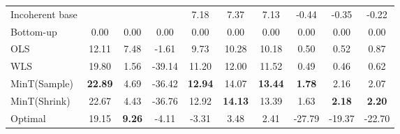 \documentclass[12pt]{article}
\theoremstyle{definition}
\begin{document}
\begin{table}[H]
{\begin{tabular}{lccccccccc}
			\toprule
			Incoherent base & & & & 7.18 & 7.37 & 7.13 & -0.44 & -0.35 & -0.22\\
			Bottom-up & 0.00 & 0.00 & 0.00 & 0.00 & 0.00 & 0.00 & 0.00 & 0.00 & 0.00\\
			OLS & 12.11 & 7.48 & -1.61 & 9.73 & 10.28 & 10.18 & 0.50 & 0.52 & 0.87\\
			WLS & 19.80 & 1.56 & -39.14 & 11.20 & 12.00 & 11.52 & 0.49 & 0.46 & 0.62\\
			MinT(Sample) & \textbf{22.89} & 4.69 & -36.42 & \textbf{12.94} & 14.07 & \textbf{13.44} & \textbf{1.78} & 2.16 & 2.07\\
			MinT(Shrink) & 22.67 & 4.43 & -36.76 & 12.92 & \textbf{14.13} & 13.39 & 1.63 & \textbf{2.18} & \textbf{2.20}\\
			Optimal & 19.15 & \textbf{9.26} & -4.11 & -3.31 & 3.48 & 2.41 & -27.79 & -19.37 & -22.70\\
			\bottomrule
		\end{tabular}
	}
\end{table}
\end{document}
